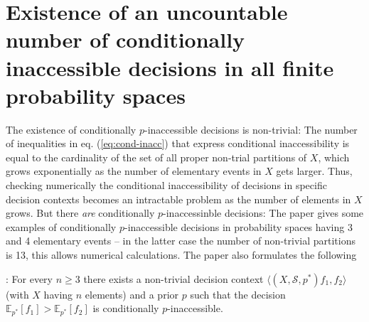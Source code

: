 \documentclass[10pt, letterpaper]{article}%
\theoremstyle{definition}
\newcommand{\E}{\mathbb E}
\newcommand{\1}{\mathbf 1}
\begin{document}
\section{Existence of an uncountable number of conditionally inaccessible decisions in all finite probability spaces}
The existence of conditionally $p$-inaccessible decisions is non-trivial: The number of inequalities in eq. (\ref{eq:cond-inacc}) that express conditional inaccessibility is equal to the cardinality of the set of all proper non-trial partitions of $X$, which grows exponentially as the number of elementary events in $X$ gets larger. Thus, checking numerically the conditional inaccessibility of decisions in specific decision contexts becomes an intractable problem as the number of elements in $X$ grows. But there \emph{are} conditionally $p$-inaccessinble decisions: The paper \cite{Redei-Jing2026} gives some examples of conditionally $p$-inaccessible decisions in probability spaces having 3 and 4 elementary events -- in the latter case the number of non-trivial partitions is 13, this allows numerical calculations. The paper \cite{Redei-Jing2026} also formulates the following   

\medskip
{}:
For every $n\ge 3$ there exists a non-trivial decision context $\langle (X,\mathcal{S},p^*) f_1, f_2\rangle$ (with $X$ having $n$ elements) and a prior $p$ such that the decision
$\E_{p^*}[f_1]>\E_{p^*}[f_2]$ is conditionally $p$-inaccessible.
\medskip
\end{document}
